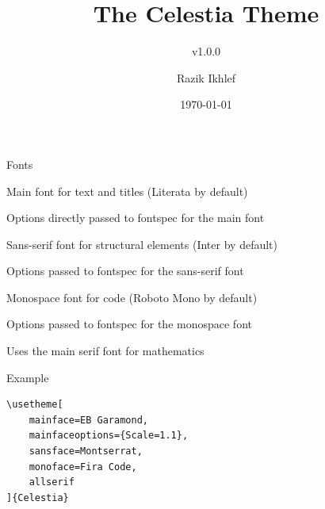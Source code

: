 \documentclass[10pt,english,aspectratio=1610,xcolor=svgnames]{beamer}
\title{The Celestia Theme}
\subtitle{v1.0.0}
\author{Razik Ikhlef}
\date{\today}
\begin{document}
\begin{frame}[plain]
    \titlepage
\end{frame}

\begin{frame}[fragile]{Fonts}
    \begin{description}[mainfaceoptions]
        \item[mainface] Main font for text and titles (\alert{Literata} by default)
        \item[mainfaceoptions] Options directly passed to \alert{fontspec} for the main font
        \item[sansface] Sans-serif font for structural elements (\alert{Inter} by default)
        \item[sansfaceoptions] Options passed to \alert{fontspec} for the sans-serif font
        \item[monoface] Monospace font for code (\alert{Roboto Mono} by default)
        \item[monofaceoptions] Options passed to \alert{fontspec} for the monospace font
        \item[allserif] Uses the main serif font for mathematics
    \end{description}

    \begin{exampleblock}{Example}
        \begin{lstlisting}[style=latex]
\usetheme[
    mainface=EB Garamond,
    mainfaceoptions={Scale=1.1},
    sansface=Montserrat,
    monoface=Fira Code,
    allserif
]{Celestia}
        \end{lstlisting}
    \end{exampleblock}
\end{frame}
\end{document}
